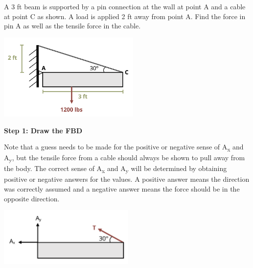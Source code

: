 \documentclass[
  letterpaper,
  DIV=11,
  numbers=noendperiod]{scrreprt}
\theoremstyle{definition}
\theoremstyle{remark}
\begin{document}
\begin{tcolorbox}[enhanced jigsaw, leftrule=.75mm, colbacktitle=quarto-callout-tip-color!10!white, breakable, opacityback=0, colback=white, titlerule=0mm, toprule=.15mm, colframe=quarto-callout-tip-color-frame, coltitle=black, title={Example 1.1}, toptitle=1mm, bottomrule=.15mm, rightrule=.15mm, left=2mm, arc=.35mm, opacitybacktitle=0.6, bottomtitle=1mm]

A 3 ft beam is supported by a pin connection at the wall at point A and
a cable at point C as shown. A load is applied 2 ft away from point A.
Find the force in pin A as well as the tensile force in the cable.

\begin{center}
\includegraphics[width=2.75in,height=\textheight]{images/CH1 PNGs/example 1.1 part 1.png}
\end{center}

\begin{tcolorbox}[enhanced jigsaw, leftrule=.75mm, colbacktitle=quarto-callout-tip-color!10!white, breakable, opacityback=0, colback=white, titlerule=0mm, toprule=.15mm, colframe=quarto-callout-tip-color-frame, coltitle=black, title={Solution}, toptitle=1mm, bottomrule=.15mm, rightrule=.15mm, left=2mm, arc=.35mm, opacitybacktitle=0.6, bottomtitle=1mm]

\textbf{Step 1: Draw the FBD}

Note that a guess needs to be made for the positive or negative sense of
A\textsubscript{x} and A\textsubscript{y}, but the tensile force from a
cable should always be shown to pull away from the body. The correct
sense of A\textsubscript{x} and A\textsubscript{y} will be determined by
obtaining positive or negative answers for the values. A positive answer
means the direction was correctly assumed and a negative answer means
the force should be in the opposite direction.

\begin{center}
\includegraphics[width=2.64583in,height=\textheight]{images/CH1 PNGs/example 1.1 part 2.png}
\end{center}


\end{tcolorbox}
\end{tcolorbox}
\end{document}
